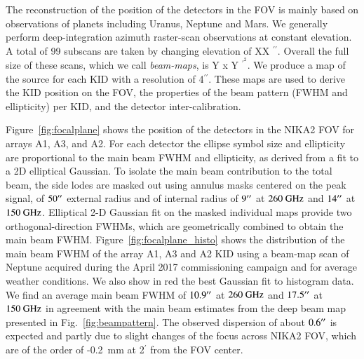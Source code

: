 \documentclass[]{aa} %
\begin{document}
The reconstruction of the position of the detectors in the FOV is mainly based on observations of planets including Uranus, Neptune and Mars. We generally perform deep-integration azimuth raster-scan observations at constant elevation. A total of 99 subscans are taken by changing elevation of XX $^{\prime \prime}$. Overall the full size of these scans, which we call {\it beam-maps}, is Y x Y $^{\prime^{2}}$. We produce a map of the source for each KID with a resolution of 4$^{\prime \prime}$. These maps are used to derive the KID position on the FOV, the properties of the beam pattern (FWHM and ellipticity) per KID, and the detector inter-calibration. 

Figure~\ref{fig:focalplane} shows the position of the detectors in the NIKA2 FOV for arrays A1, A3, and A2. For each detector the ellipse symbol size and ellipticity are proportional to the main beam FWHM and ellipticity, as derived from a fit to a 2D elliptical Gaussian. To isolate the main beam contribution to the total beam, the
side lodes are masked out using annulus masks centered on the peak signal, of $50\hbox{$^{\prime\prime}$}$ external radius and of internal radius of $9\hbox{$^{\prime\prime}$}$ at $260~\rm{GHz}$ and $14\hbox{$^{\prime\prime}$}$ at $150~\rm{GHz}$. Elliptical 2-D Gaussian fit on the masked individual maps provide two orthogonal-direction FWHMs, which are geometrically
combined to obtain the main beam FWHM. Figure~\ref{fig:focalplane_histo} shows the distribution of the main
beam FWHM of the array A1, A3 and A2 KID using a beam-map scan of Neptune acquired during the April 2017 commissioning campaign and for average weather conditions. We also show in red the best Gaussian fit to histogram data. We find an average main beam FWHM of $10.9\hbox{$^{\prime\prime}$}$ at $260~\rm{GHz}$ and $17.5\hbox{$^{\prime\prime}$}$ at $150~\rm{GHz}$ in agreement with the main beam estimates from the deep beam map presented in Fig.~\ref{fig:beampattern}. The observed dispersion of about $0.6\hbox{$^{\prime\prime}$}$ is expected and partly due to slight changes of the focus across NIKA2 FOV, which are of the order of -0.2~\rm{mm} at 2$^{\prime}$ from the FOV center.
 
\end{document}
